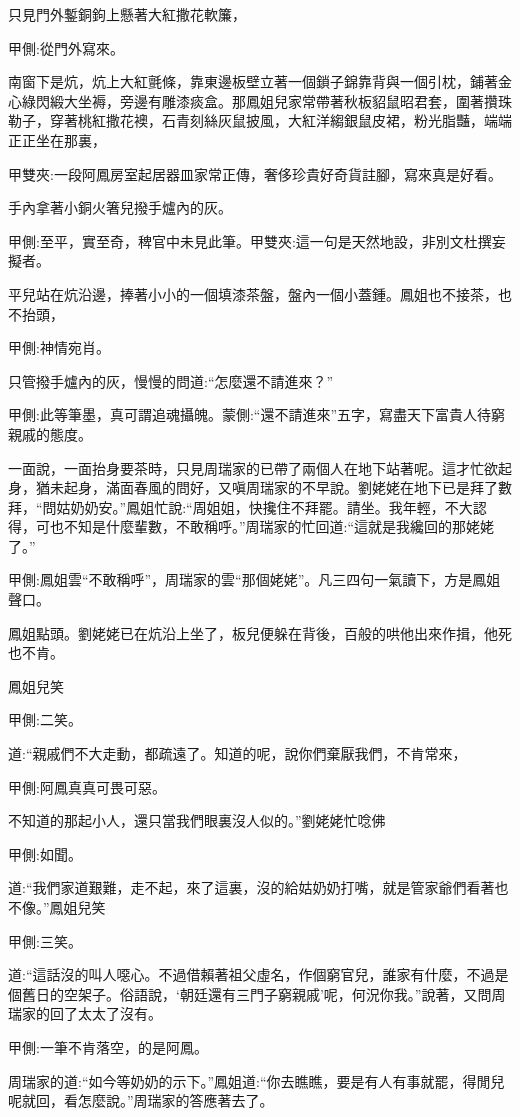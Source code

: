 \begin{parag}
    只見門外鏨銅鉤上懸著大紅撒花軟簾，\begin{note}甲側:從門外寫來。\end{note}南窗下是炕，炕上大紅氈條，靠東邊板壁立著一個鎖子錦靠背與一個引枕，鋪著金心綠閃緞大坐褥，旁邊有雕漆痰盒。那鳳姐兒家常帶著秋板貂鼠昭君套，圍著攢珠勒子，穿著桃紅撒花襖，石青刻絲灰鼠披風，大紅洋縐銀鼠皮裙，粉光脂豔，端端正正坐在那裏，\begin{note}甲雙夾:一段阿鳳房室起居器皿家常正傳，奢侈珍貴好奇貨註腳，寫來真是好看。\end{note}手內拿著小銅火箸兒撥手爐內的灰。\begin{note}甲側:至平，實至奇，稗官中未見此筆。甲雙夾:這一句是天然地設，非別文杜撰妄擬者。\end{note}平兒站在炕沿邊，捧著小小的一個填漆茶盤，盤內一個小蓋鍾。鳳姐也不接茶，也不抬頭，\begin{note}甲側:神情宛肖。\end{note}只管撥手爐內的灰，慢慢的問道:“怎麼還不請進來？”\begin{note}甲側:此等筆墨，真可謂追魂攝魄。蒙側:“還不請進來”五字，寫盡天下富貴人待窮親戚的態度。\end{note}一面說，一面抬身要茶時，只見周瑞家的已帶了兩個人在地下站著呢。這才忙欲起身，猶未起身，滿面春風的問好，又嗔周瑞家的不早說。劉姥姥在地下已是拜了數拜，“問姑奶奶安。”鳳姐忙說:“周姐姐，快攙住不拜罷。請坐。我年輕，不大認得，可也不知是什麼輩數，不敢稱呼。”周瑞家的忙回道:“這就是我纔回的那姥姥了。”\begin{note}甲側:鳳姐雲“不敢稱呼”，周瑞家的雲“那個姥姥”。凡三四句一氣讀下，方是鳳姐聲口。\end{note}鳳姐點頭。劉姥姥已在炕沿上坐了，板兒便躲在背後，百般的哄他出來作揖，他死也不肯。
\end{parag}


\begin{parag}
    鳳姐兒笑\begin{note}甲側:二笑。\end{note}道:“親戚們不大走動，都疏遠了。知道的呢，說你們棄厭我們，不肯常來，\begin{note}甲側:阿鳳真真可畏可惡。\end{note}不知道的那起小人，還只當我們眼裏沒人似的。”劉姥姥忙唸佛\begin{note}甲側:如聞。\end{note}道:“我們家道艱難，走不起，來了這裏，沒的給姑奶奶打嘴，就是管家爺們看著也不像。”鳳姐兒笑\begin{note}甲側:三笑。\end{note}道:“這話沒的叫人噁心。不過借賴著祖父虛名，作個窮官兒，誰家有什麼，不過是個舊日的空架子。俗語說，‘朝廷還有三門子窮親戚’呢，何況你我。”說著，又問周瑞家的回了太太了沒有。\begin{note}甲側:一筆不肯落空，的是阿鳳。\end{note}周瑞家的道:“如今等奶奶的示下。”鳳姐道:“你去瞧瞧，要是有人有事就罷，得閒兒呢就回，看怎麼說。”周瑞家的答應著去了。
\end{parag}


